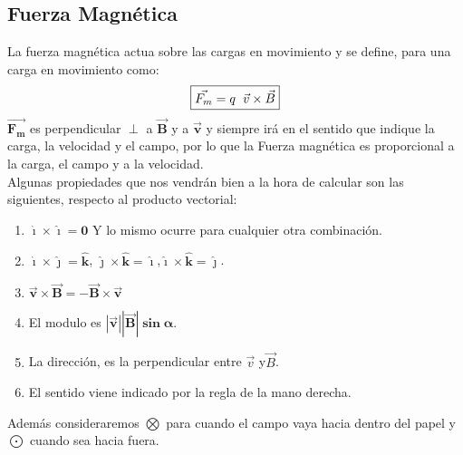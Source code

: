 \subsection{Fuerza Magnética}
\newline
\noindent La fuerza magnética actua sobre las cargas en movimiento y se define, para una carga en movimiento como:
\[
        \boxed{\vec{F_m} = q\hspace{2mm} \vec{v} \times \vec{B}}
\]
\noindent \(\bm{\vec{F_m}}\) es perpendicular \(\bm{\perp}\) a \(\bm{\vec{B}}\) y a \(\bm{\vec{v}}\) y siempre irá en el sentido que indique la carga, la velocidad y el campo, por lo que la Fuerza magnética es proporcional a la carga, el campo y a la velocidad.
\\
Algunas propiedades que nos vendrán bien a la hora de calcular son las siguientes, respecto al producto vectorial:
\begin{enumerate}
        \item \(\bm{\hat{\imath} \times \hat{\imath} = 0}\) Y lo mismo ocurre para cualquier otra combinación.
        \item \(\bm{\hat{\imath}\times \hat{\jmath} = \hat{k}}\), \(\bm{\hat{\jmath}\times\hat{k}=\hat{\imath}}\),\(\bm{\hat{\imath}\times\hat{k}=\hat{\jmath}}\).
        \item \(\bm{\vec{v} \times \vec{B} = - \vec{B} \times \vec{v}}\)
        \item El modulo es \(\bm{\left | \vec{v} \right |\left | \vec{B} \right |\sin{\alpha}}\).
        \item La dirección, es la perpendicular entre \(\vec{v}\) y\(\vec{B}\).
        \item El sentido viene indicado por la regla de la mano derecha.
\end{enumerate}
\noindent Además consideraremos \(\bm{\bigotimes}\) para cuando el campo vaya hacia dentro del papel y \(\bm{\bigodot}\) cuando sea hacia fuera.

